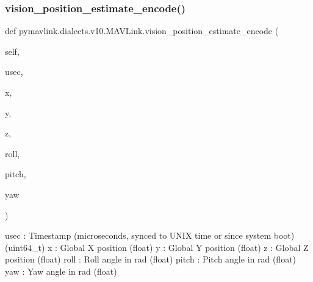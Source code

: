 \begin{DoxyVerb}
\begin{DoxyVerb}
\begin{DoxyVerb}
\begin{DoxyVerb}
\begin{DoxyVerb}
\begin{DoxyVerb}
\begin{DoxyVerb}
\begin{DoxyVerb}
\begin{DoxyVerb}
\begin{DoxyVerb}
\subsubsection{\texorpdfstring{vision\+\_\+position\+\_\+estimate\+\_\+encode()}{vision\_position\_estimate\_encode()}}
{\footnotesize\ttfamily def pymavlink.\+dialects.\+v10.\+M\+A\+V\+Link.\+vision\+\_\+position\+\_\+estimate\+\_\+encode (\begin{DoxyParamCaption}\item[{}]{self,  }\item[{}]{usec,  }\item[{}]{x,  }\item[{}]{y,  }\item[{}]{z,  }\item[{}]{roll,  }\item[{}]{pitch,  }\item[{}]{yaw }\end{DoxyParamCaption})}

\begin{DoxyVerb}usec                      : Timestamp (microseconds, synced to UNIX time or since system boot) (uint64_t)
x                         : Global X position (float)
y                         : Global Y position (float)
z                         : Global Z position (float)
roll                      : Roll angle in rad (float)
pitch                     : Pitch angle in rad (float)
yaw                       : Yaw angle in rad (float)\end{DoxyVerb}
 \mbox{\label{classpymavlink_1_1dialects_1_1v10_1_1MAVLink_a66bbaef268733d47c89bdfdaa7308e32}} 

\end{DoxyVerb}
\end{DoxyVerb}
\end{DoxyVerb}
\end{DoxyVerb}
\end{DoxyVerb}
\end{DoxyVerb}
\end{DoxyVerb}
\end{DoxyVerb}
\end{DoxyVerb}
\end{DoxyVerb}
